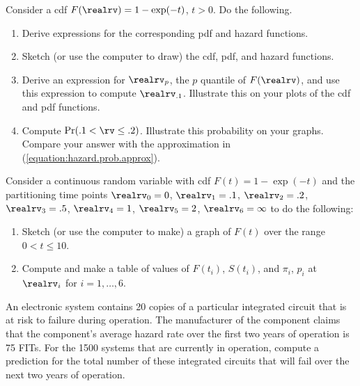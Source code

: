 \begin{exercise}
Consider a cdf $F(\realrv)=1-\exp(-t)$, $t>0$. Do the following.
\begin{enumerate}
\item
Derive expressions for the corresponding pdf and hazard functions.
\item
Sketch (or use the computer to draw) the cdf, pdf, and hazard functions.
\item
Derive an expression for $\realrv_{p}$, the $p$ quantile of $F(\realrv)$,
and use this expression to compute
$\realrv_{.1}$. Illustrate this on your plots of the cdf and pdf functions.
\item
Compute $\Pr(.1 < \rv \leq .2)$. Illustrate this probability on your
graphs. Compare your answer with the approximation in
(\ref{equation:hazard.prob.approx}).
\end{enumerate}
\end{exercise}


\begin{exercise1}
Consider a continuous random variable with cdf $F(t)=1-\exp(-t)$ and the partitioning
time points $\realrv_{0}=0$, $\realrv_{1}=.1$,
$\realrv_{2}=.2$, $\realrv_{3}=.5$, $\realrv_{4}=1$,
$\realrv_{5}=2$, $\realrv_{6}=\infty$ to do the following:
\begin{enumerate}
\item
Sketch (or use the computer to make)
a graph of $F(t)$ over the range $0 < t \leq 10$.
\item
Compute and make a table
of values of $F(t_{i})$, $S(t_{i})$, and $\pi_{i}$, $p_{i}$
at $\realrv_{i}$ for $i=1, \ldots, 6$.
\end{enumerate}
\end{exercise1}

\begin{exercise}
An electronic system contains 20 copies of a particular integrated
circuit that is at risk to failure during operation.  The manufacturer
of the component claims that the component's average hazard rate over
the first two years of operation is 75 FITs.  For the 1500 systems
that are currently in operation, compute a prediction for the total number
of these integrated circuits that will fail over the next two years
of operation.
\end{exercise}


